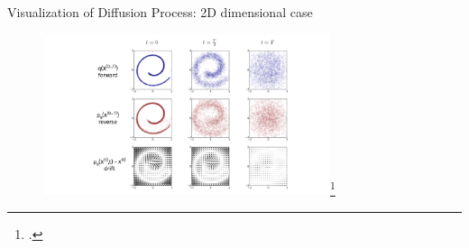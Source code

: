 \documentclass[aspectratio=169, 9pt]{beamer}
\theoremstyle{definition}
\begin{document}
\begin{frame}{Visualization of Diffusion Process: 2D dimensional case}
  \begin{figure}[h]
    \centering
    \includegraphics[width=0.75\textwidth]{./pic/summary-forw-reverse.png}\footcite{thermodynamic}
  \end{figure}
\end{frame}
\end{document}
